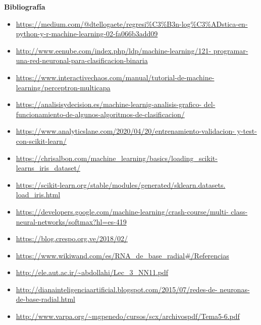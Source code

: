 \documentclass[letterpaper,11pt]{article}
\begin{document}
\textbf{Bibliografía}
\begin{itemize}
    \item \url{https://medium.com/@dtellogaete/regresi%
               python-y-r-machine-learning-02-fa066b3add09}
    \item \url{http://www.eenube.com/index.php/ldp/machine-learning/121-
               programar-una-red-neuronal-para-clasificacion-binaria}
    \item \url{https://www.interactivechaos.com/manual/tutorial-de-machine-
               learning/perceptron-multicapa}
    \item \url{https://analisisydecision.es/machine-learnig-analisis-grafico-
               del-funcionamiento-de-algunos-algoritmos-de-clasificacion/}
    \item \url{https://www.analyticslane.com/2020/04/20/entrenamiento-validacion-
               y-test-con-scikit-learn/}
    \item \url{https://chrisalbon.com/machine_learning/basics/loading_scikit-
               learns_iris_dataset/}
    \item \url{https://scikit-learn.org/stable/modules/generated/sklearn.datasets.
               load_iris.html}
    \item \url{https://developers.google.com/machine-learning/crash-course/multi-
               class-neural-networks/softmax?hl=es-419}
    \item \url{https://blog.crespo.org.ve/2018/02/}
    \item \url{https://www.wikiwand.com/es/RNA_de_base_radial#/Referencias}
    \item \url{http://ele.aut.ac.ir/~abdollahi/Lec_3_NN11.pdf}
    \item \url{http://dianainteligenciaartificial.blogspot.com/2015/07/redes-de-
               neuronas-de-base-radial.html}
    \item \url{http://www.varpa.org/~mgpenedo/cursos/scx/archivospdf/Tema5-6.pdf}
\end{itemize}
\end{document}
